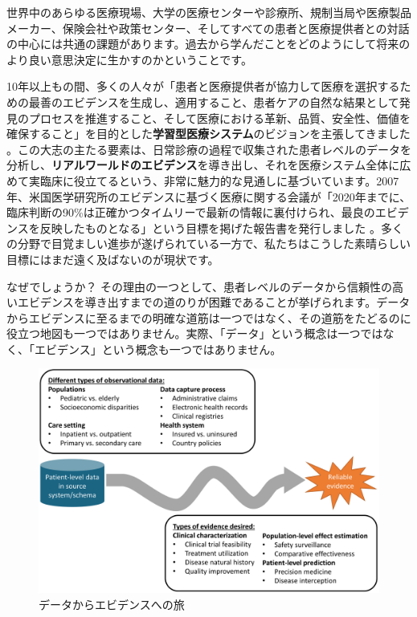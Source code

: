 \documentclass[
  11pt]{book}
\theoremstyle{definition}
\theoremstyle{definition}
\theoremstyle{definition}
\theoremstyle{definition}
\theoremstyle{remark}
\begin{document}
世界中のあらゆる医療現場、大学の医療センターや診療所、規制当局や医療製品メーカー、保険会社や政策センター、そしてすべての患者と医療提供者との対話の中心には共通の課題があります。過去から学んだことをどのようにして将来のより良い意思決定に生かすのかということです。

10年以上もの間、多くの人々が「患者と医療提供者が協力して医療を選択するための最善のエビデンスを生成し、適用すること、患者ケアの自然な結果として発見のプロセスを推進すること、そして医療における革新、品質、安全性、価値を確保すること」を目的とした\textbf{学習型医療システム}のビジョンを主張してきました \citep{olsen2007learning} 。この大志の主たる要素は、日常診療の過程で収集された患者レベルのデータを分析し、\textbf{リアルワールドのエビデンス}を導き出し、それを医療システム全体に広めて実臨床に役立てるという、非常に魅力的な見通しに基づいています。2007年、米国医学研究所のエビデンスに基づく医療に関する会議が「2020年までに、臨床判断の90\%は正確かつタイムリーで最新の情報に裏付けられ、最良のエビデンスを反映したものとなる」という目標を掲げた報告書を発行しました \citep{olsen2007learning}。多くの分野で目覚ましい進歩が遂げられている一方で、私たちはこうした素晴らしい目標にはまだ遠く及ばないのが現状です。

なぜでしょうか？ その理由の一つとして、患者レベルのデータから信頼性の高いエビデンスを導き出すまでの道のりが困難であることが挙げられます。データからエビデンスに至るまでの明確な道筋は一つではなく、その道筋をたどるのに役立つ地図も一つではありません。実際、「データ」という概念は一つではなく、「エビデンス」という概念も一つではありません。

\begin{figure}

{\centering \includegraphics[width=1\linewidth]{images/OhdsiCommunity/datajourney} 

}

\caption{データからエビデンスへの旅}\label{fig:datajourney}
\end{figure}
\end{document}
